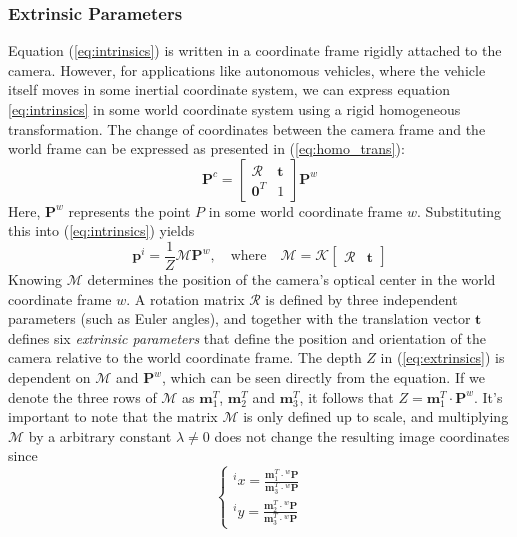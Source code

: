 \subsubsection{Extrinsic Parameters}
Equation (\ref{eq:intrinsics}) is written in a coordinate frame rigidly attached to the camera. However, for applications like autonomous vehicles, where the vehicle itself moves in some inertial coordinate system, we can express equation \ref{eq:intrinsics} in some world coordinate system using a rigid homogeneous transformation. The change of coordinates between the camera frame and the world frame can be expressed as presented in (\ref{eq:homo_trans}):
\begin{equation}
    \mathbf{P}^c=\begin{bmatrix}\mathcal{R} & \mathbf{t}\\ \mathbf{0}^T & 1\end{bmatrix}\mathbf{P}^w
\end{equation}
Here, $\mathbf{P}^w$ represents the point $P$ in some world coordinate frame $w$. Substituting this into (\ref{eq:intrinsics}) yields
\begin{equation}
\label{eq:extrinsics}
    \mathbf{p}^i=\frac{1}{Z}\mathcal{M}\mathbf{P}^w,\quad \text{where}\quad \mathcal{M}=\mathcal{K}\begin{bmatrix}\mathcal{R} & \mathbf{t}\end{bmatrix}
\end{equation}
Knowing $\mathcal{M}$ determines the position of the camera's optical center in the world coordinate frame $w$. A rotation matrix $\mathcal{R}$ is defined by three independent parameters (such as Euler angles), and together with the translation vector $\mathbf{t}$ defines six \textit{extrinsic parameters} that define the position and orientation of the camera relative to the world coordinate frame. The depth $Z$ in (\ref{eq:extrinsics}) is dependent on $\mathcal{M}$ and $\mathbf{P}^w$, which can be seen directly from the equation. If we denote the three rows of $\mathcal{M}$ as $\mathbf{m}_1^T$, $\mathbf{m}_2^T$ and $\mathbf{m}_3^T$, it follows that $Z=\mathbf{m}_1^T\cdot\mathbf{P}^w$. It's important to note that the matrix $\mathcal{M}$ is only defined up to scale, and multiplying $\mathcal{M}$ by a arbitrary constant $\lambda\neq0$ does not change the resulting image coordinates since
\begin{equation}
\begin{cases}
    {}^i x=\frac{\mathbf{m}_1^T\cdot {}^w\mathbf{P}}{\mathbf{m}_3^T\cdot {}^w\mathbf{P}}\\
    {}^i y=\frac{\mathbf{m}_2^T\cdot {}^w\mathbf{P}}{\mathbf{m}_3^T\cdot {}^w\mathbf{P}}
\end{cases}
\end{equation}
